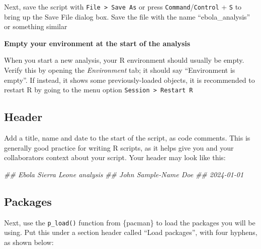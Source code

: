 \documentclass[
  letterpaper,
  DIV=11,
  numbers=noendperiod]{scrreprt}
\newenvironment{Shaded}{\begin{snugshade}}{\end{snugshade}}
\newcommand{\DocumentationTok}[1]{\textcolor[rgb]{0.37,0.37,0.37}{\textit{#1}}}
\begin{document}
Next, save the script with \texttt{File\ \textgreater{}\ Save\ As} or
press \texttt{Command}/\texttt{Control} + \texttt{S} to bring up the
Save File dialog box. Save the file with the name ``ebola\_analysis'' or
something similar

\begin{tcolorbox}[enhanced jigsaw, colframe=quarto-callout-note-color-frame, rightrule=.15mm, opacityback=0, breakable, coltitle=black, colbacktitle=quarto-callout-note-color!10!white, bottomrule=.15mm, leftrule=.75mm, toprule=.15mm, arc=.35mm, bottomtitle=1mm, colback=white, left=2mm, opacitybacktitle=0.6, titlerule=0mm, title=\textcolor{quarto-callout-note-color}{\faInfo}\hspace{0.5em}{Side Note}, toptitle=1mm]

\textbf{Empty your environment at the start of the analysis}

When you start a new analysis, your R environment should usually be
empty. Verify this by opening the \emph{Environment} tab; it should say
``Environment is empty''. If instead, it shows some previously-loaded
objects, it is recommended to restart R by going to the menu option
\texttt{Session\ \textgreater{}\ Restart\ R}

\end{tcolorbox}

\hypertarget{header}{%
\subsection{Header}\label{header}}

Add a title, name and date to the start of the script, as code comments.
This is generally good practice for writing R scripts, as it helps give
you and your collaborators context about your script. Your header may
look like this:

\begin{Shaded}
\begin{Highlighting}[]
\DocumentationTok{\#\# Ebola Sierra Leone analysis}
\DocumentationTok{\#\# John Sample{-}Name Doe}
\DocumentationTok{\#\# 2024{-}01{-}01}
\end{Highlighting}
\end{Shaded}

\hypertarget{packages-2}{%
\subsection{Packages}\label{packages-2}}

Next, use the \texttt{p\_load()} function from \{pacman\} to load the
packages you will be using. Put this under a section header called
``Load packages'', with four hyphens, as shown below:
\end{document}
